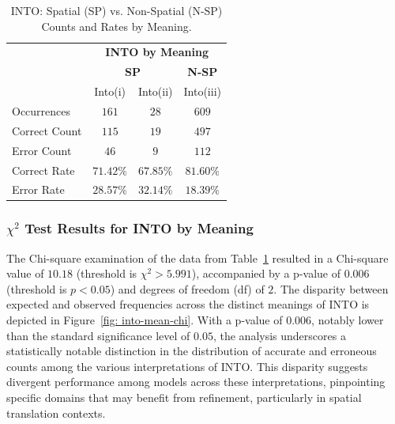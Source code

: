 \begin{table}[htb]
\centering
\begin{tabular}{lccc}
\toprule
 & \multicolumn{3}{c}{\textbf{INTO by Meaning}} \\ 
 & \multicolumn{2}{c}{\textbf{SP}} & \textbf{N-SP} \\ 
 & Into(i) & Into(ii) & Into(iii) \\
\midrule
Occurrences & $161$ & $28$ & $609$ \\ 
Correct Count & $115$ & $19$ & $497$ \\ 
Error Count & $46$ & $9$ & $112$ \\ 
\midrule
Correct Rate & $\mathbf{71.42\%}$ & $67.85\%$ & $\mathbf{81.60\%}$ \\
\midrule
Error Rate & $28.57\%$ & $\mathbf{32.14\%}$ & $18.39\%$
\\ 
\bottomrule
\end{tabular}
\caption{INTO: Spatial (SP) vs. Non-Spatial (N-SP) Counts and Rates by Meaning.}
\label{tab:into-senses}
\end{table}


\subsubsection{$\chi^2$ Test Results for INTO by Meaning} 

The Chi-square examination of the data from Table~\ref{tab:into-senses} resulted in a Chi-square value of $10.18$ (threshold is $\chi^2 > 5.991$), accompanied by a p-value of $0.006$ (threshold is $p < 0.05$) and degrees of freedom (df) of $2$. The disparity between expected and observed frequencies across the distinct meanings of INTO is depicted in Figure~\ref{fig: into-mean-chi}. With a p-value of $0.006$, notably lower than the standard significance level of $0.05$, the analysis underscores a statistically notable distinction in the distribution of accurate and erroneous counts among the various interpretations of INTO. This disparity suggests divergent performance among models across these interpretations, pinpointing specific domains that may benefit from refinement, particularly in spatial translation contexts.

